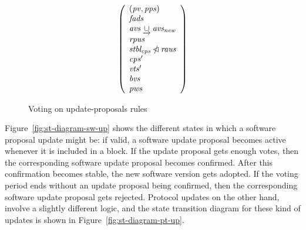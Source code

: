 \begin{figure}[htb]
\begin{equation}
{      {
        \left(
          \begin{array}{l}
            (\mathit{pv}, \mathit{pps})\\
            \mathit{fads}\\
            \mathit{avs} \mathbin{\underrightarrow\cup}\mathit{avs_{new}}\\
            \mathit{rpus}\\
            \mathit{stbl_{cps}} \mathbin{\slashed{\lhd}}\mathit{raus}\\
            \mathit{cps'}\\
            \mathit{vts'}\\
            \mathit{bvs}\\
            \mathit{pws}
          \end{array}
        \right)
      }
    }
  \end{equation}
  \caption{Voting on update-proposals rules}
  \label{fig:rules:upi-vote}
\end{figure}

Figure~\ref{fig:st-diagram-sw-up} shows the different states in which a
software proposal update might be: if valid, a software update proposal becomes
active whenever it is included in a block. If the update proposal gets enough
votes, then the corresponding software update proposal becomes confirmed. After
this confirmation becomes stable, the new software version gets adopted. If the
voting period ends without an update proposal being confirmed, then the
corresponding software update proposal gets rejected.
%
Protocol updates on the other hand, involve a slightly different logic, and the
state transition diagram for these kind of updates is shown in
Figure~\ref{fig:st-diagram-pt-up}.

